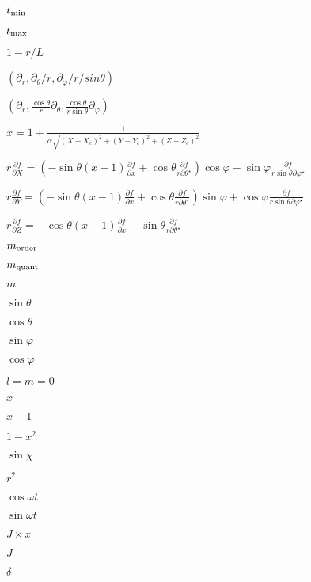 \documentclass{article}
\begin{document}
$ t_{\rm min} $
\pagebreak

$ t_{\rm max} $
\pagebreak

$ 1 - r/L$
\pagebreak

$(\partial_r, \partial_\theta /r , \partial_\varphi/r/sin\theta)$
\pagebreak

$(\partial_r, \frac{\cos \theta}{r} \partial_\theta , \frac{\cos \theta}{r \sin \theta} \partial_\varphi)$
\pagebreak

$ x = 1 + \displaystyle\frac{1}{\alpha\sqrt{(X-X_c)^2+(Y-Y_c)^2+(Z-Z_c)^2}} $
\pagebreak

$ r\displaystyle\frac{\partial f}{\partial X} = (-\sin\theta (x-1) \displaystyle\frac{\partial f}{\partial x} + \cos\theta \displaystyle\frac{\partial f}{r\partial \theta^\star}) \cos\varphi - \sin\varphi \displaystyle\frac{\partial f}{r\sin\theta \partial \varphi^\star} $
\pagebreak

$ r\displaystyle\frac{\partial f}{\partial Y} = (-\sin\theta (x-1) \displaystyle\frac{\partial f}{\partial x} + \cos\theta \displaystyle\frac{\partial f}{r\partial \theta^\star}) \sin\varphi + \cos\varphi \displaystyle\frac{\partial f}{r\sin\theta \partial \varphi^\star} $
\pagebreak

$ r\displaystyle\frac{\partial f}{\partial Z} = -\cos\theta (x-1) \displaystyle\frac{\partial f}{\partial x} - \sin\theta\displaystyle\frac{\partial f}{r\partial \theta^\star}$
\pagebreak

$m_{\rm order}$
\pagebreak

$m_{\rm quant}$
\pagebreak

$m$
\pagebreak

$ \sin \theta $
\pagebreak

$ \cos \theta $
\pagebreak

$ \sin \varphi $
\pagebreak

$ \cos \varphi $
\pagebreak

$l=m=0$
\pagebreak

$ x $
\pagebreak

$ x-1 $
\pagebreak

$ 1-x^2 $
\pagebreak

$ \sin \chi $
\pagebreak

$r^2$
\pagebreak

$\cos \omega t$
\pagebreak

$\sin \omega t$
\pagebreak

$ J \times x$
\pagebreak

$J$
\pagebreak

$\delta$
\pagebreak
\end{document}
